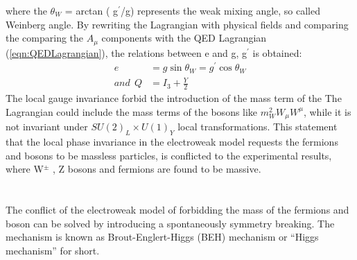 where the $\theta_{W}$ = arctan ( g$^{\prime}$/g) represents the weak mixing angle, so called Weinberg angle. By rewriting the Lagrangian with physical fields and comparing the comparing the $A_{\mu}$ components with the QED Lagrangian (\ref{eqn:QEDLagrangian}), the relations between e and g, g$^{\prime}$ is obtained:
\begin{equation}
\begin{aligned}
e&=g \sin \theta_{W}=g^{\prime} \cos \theta_{W} \\
and \ \ Q&=I_{3}+\frac{Y}{2}
\end{aligned}
\end{equation}
The local gauge invariance forbid the introduction of the mass term of the 
The Lagrangian could include the mass terms of the bosons like $m^2_W W_\mu W^\mu$, while it is not invariant under $SU(2)_L \times U(1)_Y$ local transformations.
This statement that the local phase invariance in the electroweak model requests the fermions and bosons to be massless particles, is conflicted to the experimental results, where W$^{\pm}$ , Z bosons and fermions are found to be massive.
\\ \\
\noindent\textbf{} \\ 
The conflict of the electroweak model of forbidding the mass of the fermions and boson can be solved by introducing a spontaneously symmetry breaking.
The mechanism is known as Brout-Englert-Higgs (BEH) mechanism or “Higgs mechanism” for short.

